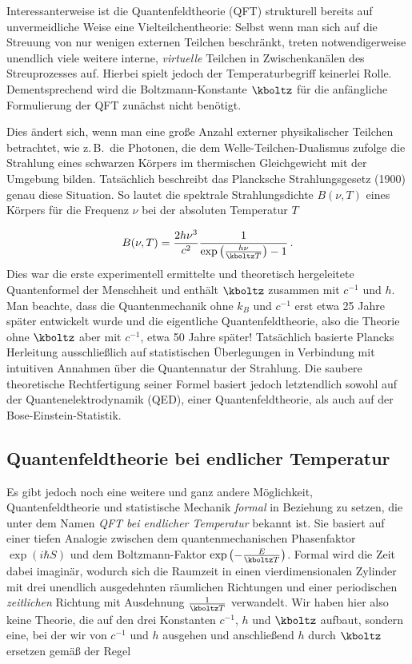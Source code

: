 
\newpage {}
\label{sec:0111}

Interessanterweise ist die Quantenfeldtheorie (QFT) strukturell bereits auf unvermeidliche Weise eine Vielteilchentheorie: Selbst wenn man sich auf die Streuung von nur wenigen externen Teilchen beschränkt, treten notwendigerweise unendlich viele weitere interne, \emph{virtuelle} Teilchen in Zwischenkanälen des Streuprozesses auf. Hierbei spielt jedoch der Temperaturbegriff keinerlei Rolle. Dementsprechend wird die Boltzmann-Konstante $\kboltz$ für die anfängliche Formulierung der QFT zunächst nicht benötigt.

Dies ändert sich, wenn man eine große Anzahl externer physikalischer Teilchen betrachtet, wie z.\,B.\ die Photonen, die dem Welle-Teilchen-Dualismus zufolge die Strahlung eines schwarzen Körpers im thermischen Gleichgewicht mit der Umgebung bilden. Tatsächlich beschreibt das Plancksche Strahlungsgesetz (1900) genau diese Situation. So lautet die spektrale Strahlungsdichte $B(\nu,T)$ eines Körpers für die Frequenz $\nu$ bei der absoluten Temperatur $T$

\begin{equation*}
  B(\nu,T)=\frac{2 h \nu^3}{c^2} \frac{1}{\exp\left(\frac{h \nu}{\kboltz T}\right)-1}\,.
\end{equation*}
%
Dies war die erste experimentell ermittelte und theoretisch hergeleitete Quantenformel der Menschheit und enthält $\kboltz$ zusammen mit $c^{-1}$ und $h$. Man beachte, dass die Quantenmechanik ohne $k_B$ und $c^{-1}$ erst etwa 25 Jahre später entwickelt wurde und die eigentliche Quantenfeldtheorie, also die Theorie ohne $\kboltz$ aber mit $c^{-1}$, etwa 50 Jahre später! Tatsächlich basierte Plancks Herleitung ausschließlich auf statistischen Überlegungen in Verbindung mit intuitiven Annahmen über die Quantennatur der Strahlung. Die saubere theoretische Rechtfertigung seiner Formel basiert jedoch letztendlich sowohl auf der Quantenelektrodynamik (QED), einer Quantenfeldtheorie, als auch auf der Bose-Einstein-Statistik.


\subsection*{Quantenfeldtheorie bei endlicher Temperatur}

Es gibt jedoch noch eine weitere und ganz andere Möglichkeit, Quantenfeldtheorie und statistische Mechanik \emph{formal} in Beziehung zu setzen, die unter dem Namen \emph{QFT bei endlicher Temperatur} bekannt ist. Sie basiert auf einer tiefen Analogie zwischen dem quantenmechanischen Phasenfaktor $\exp\left(i \hbar S\right)$ und dem Boltzmann-Faktor $\exp\left(-\frac{E}{\kboltz T}\right)$. Formal wird die Zeit dabei imaginär, wodurch sich die Raumzeit in einen vierdimensionalen Zylinder mit drei unendlich ausgedehnten räumlichen Richtungen und einer periodischen \emph{zeitlichen} Richtung mit Ausdehnung
$\frac{1}{\kboltz T}$ verwandelt. Wir haben hier also keine Theorie, die auf den drei Konstanten $c^{-1}$, $h$ und $\kboltz$ aufbaut, sondern eine, bei der wir von $c^{-1}$ und $h$ ausgehen und anschließend $h$ durch $\kboltz$ ersetzen gemäß der Regel


